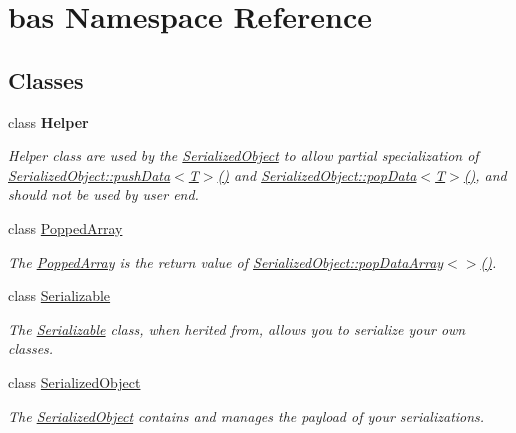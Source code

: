 \hypertarget{namespacebas}{}\section{bas Namespace Reference}
\label{namespacebas}
\subsection*{Classes}
\begin{DoxyCompactItemize}
\item 
class {\bfseries Helper}
\begin{DoxyCompactList}\small\item\em Helper class are used by the \mbox{\hyperlink{classbas_1_1SerializedObject}{Serialized\+Object}} to allow partial specialization of \mbox{\hyperlink{classbas_1_1SerializedObject_ae6d94b4b6c3d77dad3aab140ea6f7ca1}{Serialized\+Object\+::push\+Data$<$\+T$>$()}} and \mbox{\hyperlink{classbas_1_1SerializedObject_aad2a332aaecd0fba8eac2bf06b60d5df}{Serialized\+Object\+::pop\+Data$<$\+T$>$()}}, and should not be used by user end. \end{DoxyCompactList}\item 
class \mbox{\hyperlink{classbas_1_1PoppedArray}{Popped\+Array}}
\begin{DoxyCompactList}\small\item\em The \mbox{\hyperlink{classbas_1_1PoppedArray}{Popped\+Array}} is the return value of \mbox{\hyperlink{classbas_1_1SerializedObject_a700a5ad3f53a5e12e51321f29e79e422}{Serialized\+Object\+::pop\+Data\+Array$<$$>$()}}. \end{DoxyCompactList}\item 
class \mbox{\hyperlink{classbas_1_1Serializable}{Serializable}}
\begin{DoxyCompactList}\small\item\em The \mbox{\hyperlink{classbas_1_1Serializable}{Serializable}} class, when herited from, allows you to serialize your own classes. \end{DoxyCompactList}\item 
class \mbox{\hyperlink{classbas_1_1SerializedObject}{Serialized\+Object}}
\begin{DoxyCompactList}\small\item\em The \mbox{\hyperlink{classbas_1_1SerializedObject}{Serialized\+Object}} contains and manages the payload of your serializations. \end{DoxyCompactList}\end{DoxyCompactItemize}
